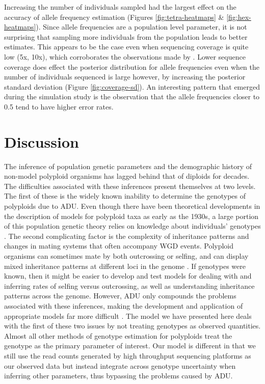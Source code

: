 \documentclass[11pt,english,letterpaper,oneside]{article}
\begin{document}
Increasing the number of individuals sampled had the largest effect on the accuracy of allele frequency estimation (Figures \ref{fig:tetra-heatmaps} \& \ref{fig:hex-heatmaps}). Since allele frequencies are a population level parameter, it is not surprising that sampling more individuals from the population leads to better estimates. This appears to be the case even when sequencing coverage is quite low (5x, 10x), which corroborates the observations made by \cite{buerkle2013popModels}. Lower sequence coverage does effect the posterior distribution for allele frequencies even when the number of individuals sequenced is large however, by increasing the posterior standard deviation (Figure \ref{fig:coverage-sd}). An interesting pattern that emerged during the simulation study is the observation that the allele frequencies closer to 0.5 tend to have higher error rates.
\medskip

\section*{Discussion}         %

The inference of population genetic parameters and the demographic history of non-model polyploid organisms has lagged behind that of diploids for decades. The difficulties associated with these inferences present themselves at two levels. The first of these is the widely known inability to determine the genotypes of polyploids due to ADU. Even though there have been theoretical developments in the description of models for polyploid taxa as early as the 1930s, a large portion of this population genetic theory relies on knowledge about individuals' genotypes \citep[e.g.,][]{haldane1930autopolyploids,wright1938polyploid}. The second complicating factor is the complexity of inheritance patterns and changes in mating systems that often accompany WGD events. Polyploid organisms can sometimes mate by both outcrossing or selfing, and can display mixed inheritance patterns at different loci in the genome \citep{dufresne2014polyPopGen}. If genotypes were known, then it might be easier to develop and test models for dealing with and inferring rates of selfing versus outcrossing, as well as understanding inheritance patterns across the genome. However, ADU only compounds the problems associated with these inferences, making the development and application of appropriate models far more difficult \citep[but see list of software in][]{dufresne2014polyPopGen}. The model we have presented here deals with the first of these two issues by not treating genotypes as observed quantities. Almost all other methods of genotype estimation for polyploids treat the genotype as the primary parameter of interest. Our model is different in that we still use the read counts generated by high throughput sequencing platforms as our observed data but instead integrate across genotype uncertainty when inferring other parameters, thus bypassing the problems caused by ADU.
\medskip
\end{document}
